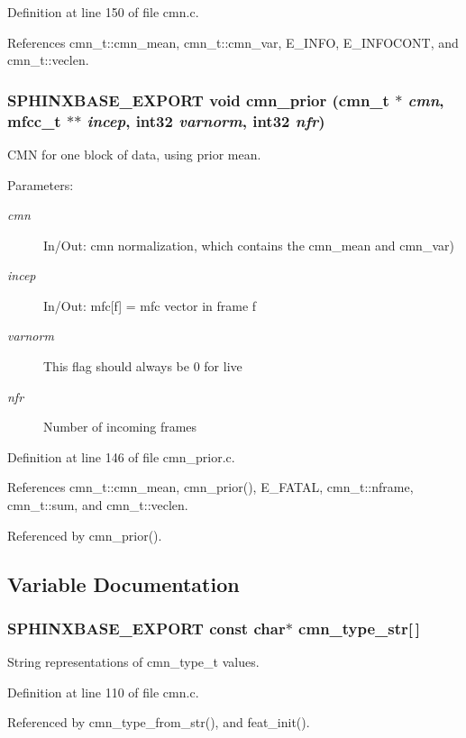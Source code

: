 Definition at line 150 of file cmn.c.

References cmn\_\-t::cmn\_\-mean, cmn\_\-t::cmn\_\-var, E\_\-INFO, E\_\-INFOCONT, and cmn\_\-t::veclen.
\subsubsection[{cmn\_\-prior}]{\setlength{\rightskip}{0pt plus 5cm}SPHINXBASE\_\-EXPORT void cmn\_\-prior ({\bf cmn\_\-t} $\ast$ {\em cmn}, \/  mfcc\_\-t $\ast$$\ast$ {\em incep}, \/  int32 {\em varnorm}, \/  int32 {\em nfr})}\label{cmn_8h_a622cf1b6a1b9a9bffd8f60b903bfc42}


CMN for one block of data, using prior mean. 

\begin{Desc}
\item[Parameters: ]\par
\begin{description}
\item[{\em 
cmn}]In/Out: cmn normalization, which contains the cmn\_\-mean and cmn\_\-var) \item[{\em 
incep}]In/Out: mfc[f] = mfc vector in frame f \item[{\em 
varnorm}]This flag should always be 0 for live \item[{\em 
nfr}]Number of incoming frames \end{description}
\end{Desc}


Definition at line 146 of file cmn\_\-prior.c.

References cmn\_\-t::cmn\_\-mean, cmn\_\-prior(), E\_\-FATAL, cmn\_\-t::nframe, cmn\_\-t::sum, and cmn\_\-t::veclen.

Referenced by cmn\_\-prior().

\subsection{Variable Documentation}
\subsubsection[{cmn\_\-type\_\-str}]{\setlength{\rightskip}{0pt plus 5cm}SPHINXBASE\_\-EXPORT const char$\ast$ {\bf cmn\_\-type\_\-str}[$\,$]}\label{cmn_8h_e2ab0bad7168386076c43fc2a421867f}


String representations of cmn\_\-type\_\-t values. 



Definition at line 110 of file cmn.c.

Referenced by cmn\_\-type\_\-from\_\-str(), and feat\_\-init().
